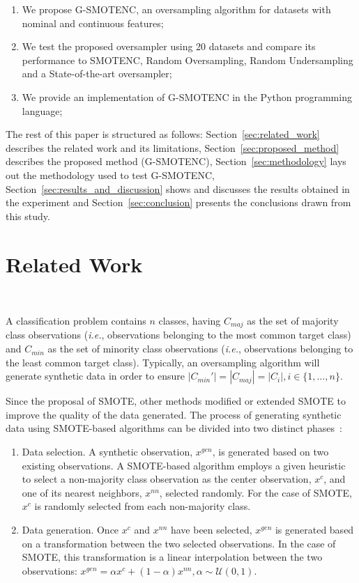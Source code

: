 \documentclass[preprint,12pt]{elsarticle}
\begin{document}
{\begin{enumerate}
    \item We propose G-SMOTENC, an oversampling algorithm for datasets with
        nominal and continuous features;
    \item We test the proposed oversampler using 20 datasets and compare its
        performance to SMOTENC, Random Oversampling, Random Undersampling and
        a State-of-the-art oversampler;
    \item We provide an implementation of G-SMOTENC in the Python programming
        language;
\end{enumerate}

The rest of this paper is structured as follows:
Section~\ref{sec:related_work} describes the related work and its limitations,
Section~\ref{sec:proposed_method} describes the proposed
method (G-SMOTENC), Section~\ref{sec:methodology} lays out the methodology
used to test G-SMOTENC, Section~\ref{sec:results_and_discussion} shows and
discusses the results obtained in the experiment and
Section~\ref{sec:conclusion} presents the conclusions drawn from this study.


\section{Related Work}~\label{sec:related_work}

A classification problem contains $n$ classes, having $C_{maj}$ as the set of
majority class observations (\textit{i.e.}, observations belonging to the most
common target class) and $C_{min}$ as the set of minority class observations
(\textit{i.e.}, observations belonging to the least common target class).
Typically, an oversampling algorithm will generate synthetic data in order to
ensure $|C_{min}'|=|C_{maj}|=|C_i|, i \in \{1, \ldots, n\}$.

Since the proposal of SMOTE, other methods modified or extended SMOTE to
improve the quality of the data generated. The process of generating synthetic
data using SMOTE-based algorithms can be divided into two distinct
phases~\cite{fernandez2018smote}:

\begin{enumerate}
    \item Data selection. A synthetic observation, $x^{gen}$, is generated
        based on two existing observations. A SMOTE-based algorithm employs a
        given heuristic to select a non-majority class observation as the
        center observation, $x^c$, and one of its nearest neighbors, $x^{nn}$,
        selected randomly. For the case of SMOTE, $x^c$ is randomly selected
        from each non-majority class.
    \item Data generation. Once $x^c$ and $x^{nn}$ have been selected, $x^{gen}$
        is generated based on a transformation between the two selected
        observations. In the case of SMOTE, this transformation is 
        a linear interpolation between the two observations: $x^{gen} = \alpha x^c
        + (1-\alpha) x^{nn}, \alpha \sim \mathcal{U}(0, 1)$.
\end{enumerate}

}
\end{document}
